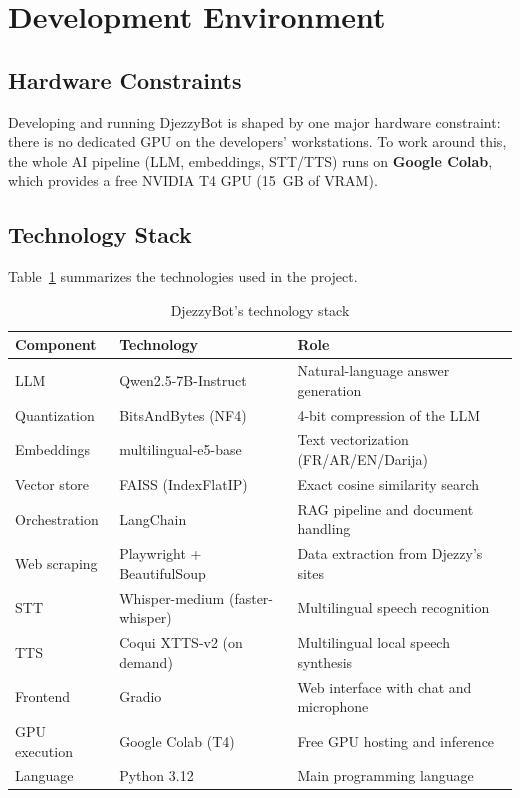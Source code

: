 \documentclass[12pt, a4paper]{report}
\newcommand{\humantext}[1]{#1}      %
\begin{document}
\section{Development Environment}

\subsection{Hardware Constraints}
\humantext{Developing and running DjezzyBot is shaped by one major hardware constraint: there is no dedicated GPU on the developers' workstations. To work around this, the whole AI pipeline (LLM, embeddings, STT/TTS) runs on \textbf{Google Colab}, which provides a free NVIDIA T4 GPU (15~GB of VRAM).}

\subsection{Technology Stack}
\humantext{Table~\ref{tab:tech_stack} summarizes the technologies used in the project.}

\begin{table}[H]
\centering
\caption{DjezzyBot's technology stack}
\label{tab:tech_stack}
\begin{tabularx}{\textwidth}{l l X}
\toprule
\textbf{Component} & \textbf{Technology} & \textbf{Role} \\
\midrule
LLM & Qwen2.5-7B-Instruct & Natural-language answer generation \\
Quantization & BitsAndBytes (NF4) & 4-bit compression of the LLM \\
Embeddings & multilingual-e5-base & Text vectorization (FR/AR/EN/Darija) \\
Vector store & FAISS (IndexFlatIP) & Exact cosine similarity search \\
Orchestration & LangChain & RAG pipeline and document handling \\
Web scraping & Playwright + BeautifulSoup & Data extraction from Djezzy's sites \\
STT & Whisper-medium (faster-whisper) & Multilingual speech recognition \\
TTS & Coqui XTTS-v2 (on demand) & Multilingual local speech synthesis \\
Frontend & Gradio & Web interface with chat and microphone \\
GPU execution & Google Colab (T4) & Free GPU hosting and inference \\
Language & Python 3.12 & Main programming language \\
\bottomrule
\end{tabularx}
\end{table}
\end{document}
